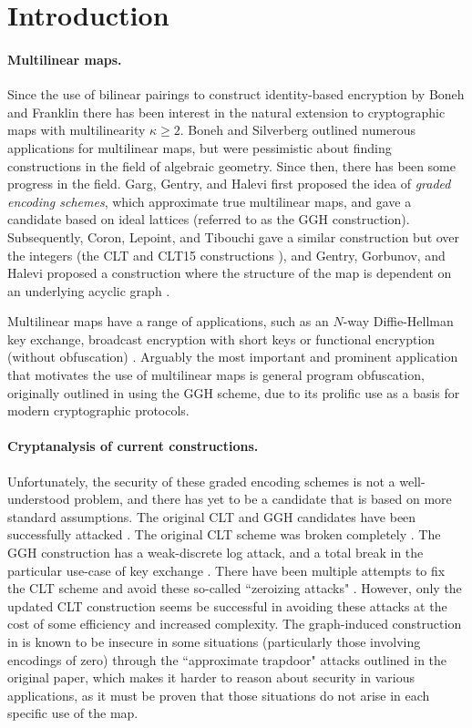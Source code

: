 \section{Introduction}

\paragraph{Multilinear maps.} Since the use of bilinear pairings to construct identity-based encryption by Boneh and Franklin \cite{bf} there has been interest in the natural extension to cryptographic maps with multilinearity $\kappa \geq 2$.  Boneh and Silverberg \cite{bs} outlined numerous applications for multilinear maps, but were pessimistic about finding constructions in the field of algebraic geometry.  Since then, there has been some progress in the field.  Garg, Gentry, and Halevi \cite{ggh13a} first proposed the idea of \textit{graded encoding schemes}, which approximate true multilinear maps, and gave a candidate based on ideal lattices (referred to as the GGH construction).  Subsequently, Coron, Lepoint, and Tibouchi gave a similar construction but over the integers (the CLT and CLT15 constructions \cite{clt, clt15}), and Gentry, Gorbunov, and Halevi proposed a construction where the structure of the map is dependent on an underlying acyclic graph \cite{ggh14a}.

Multilinear maps have a range of applications, such as an $N$-way Diffie-Hellman key exchange, broadcast encryption with short keys \cite{bs} or functional encryption (without obfuscation) \cite{blr}.  Arguably the most important and prominent application that motivates the use of multilinear maps is general program obfuscation, originally outlined in \cite{ggh13b} using the GGH scheme, due to its prolific use as a basis for modern cryptographic protocols.

\paragraph{Cryptanalysis of current constructions.}  Unfortunately, the security of these graded encoding schemes is not a well-understood problem, and there has yet to be a candidate that is based on more standard assumptions.  The original CLT and GGH candidates have been successfully attacked \cite{chl, cgh, hj}.  The original CLT scheme was broken completely \cite{chl, cgh}.  The GGH construction has a weak-discrete log attack, and a total break in the particular use-case of key exchange \cite{cgh, hj}.  There have been multiple attempts to fix the CLT scheme and avoid these so-called ``zeroizing attacks" \cite{bwz, clt14, clt15}.  However, only the updated CLT construction \cite{clt15} seems be successful in avoiding these attacks at the cost of some efficiency and increased complexity.  The graph-induced construction in \cite{ggh14a} is known to be insecure in some situations (particularly those involving encodings of zero) through the ``approximate trapdoor" attacks outlined in the original paper, which makes it harder to reason about security in various applications, as it must be proven that those situations do not arise in each specific use of the map.

